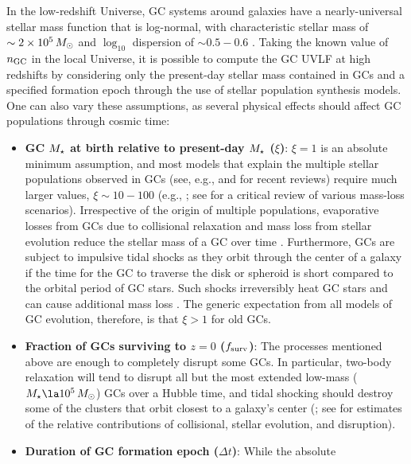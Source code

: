 \documentclass[fleqn,usenatbib]{mnras}
\newcommand{\fsurv}{f_{\rm surv}}
\begin{document}
In the low-redshift Universe, GC systems around galaxies have a nearly-universal
stellar mass function that is log-normal, with characteristic stellar mass of
$\sim 2\times 10^5\,M_{\odot}$ and $\log_{10}$ dispersion of $\sim 0.5-0.6$
\citep{harris1991, villegas2010}. Taking the known value of $n_{\rm GC}$ in the
local Universe, it is possible to compute the GC UVLF at high redshifts by
considering only the present-day stellar mass contained in GCs and a specified
formation epoch through the use of stellar population synthesis models. One can
also vary these assumptions, as several physical effects should affect GC
populations through cosmic time:
\begin{itemize}
\item \textbf{GC $M_{\star}$ at birth relative to present-day $M_{\star}$ ($\xi$)}:
  $\xi=1$ is an absolute minimum assumption, and most models that explain the
  multiple stellar populations observed in GCs (see, e.g., \citealt{gratton2012}
  and \citealt{renzini2015} for recent reviews) require much larger values,
  $\xi \sim 10-100$ (e.g., \citealt{decressin2007, dercole2008, conroy2011,
    denissenkov2014}; see \citealt{bastian2015} for a critical review of various
  mass-loss scenarios). Irrespective of the origin of multiple populations,
  evaporative losses from GCs due to collisional relaxation and mass loss from
  stellar evolution reduce the stellar mass of a GC over time
  \citep{spitzer1987, fall2001}. Furthermore, GCs are subject to impulsive tidal
  shocks as they orbit through the center of a galaxy if the time for the GC to
  traverse the disk or spheroid is short compared to the orbital period of GC
  stars. Such shocks irreversibly heat GC stars and can cause additional mass
  loss \citep{ostriker1972, spitzer1987, murali1997, gnedin1999}. The generic
  expectation from all models of GC evolution, therefore, is that $\xi>1$ for
  old GCs.
\item \textbf{Fraction of GCs surviving to $z=0$ ($\fsurv$)}: The processes
  mentioned above are enough to completely disrupt some GCs. In particular,
  two-body relaxation will tend to disrupt all but the most extended low-mass
  ($\mstar \la 10^5\,\msun$) GCs over a Hubble time, and tidal shocking should
  destroy some of the clusters that orbit closest to a galaxy's
  center (\citealt{chandrasekhar1942, spitzer1958, fall1977, binney1987}; see
  \citealt{prieto2008} for estimates of the relative contributions of
  collisional, stellar evolution, and disruption).
\item \textbf{Duration of GC formation epoch ($\Delta t$)}: While the absolute

\end{itemize}
\end{document}
